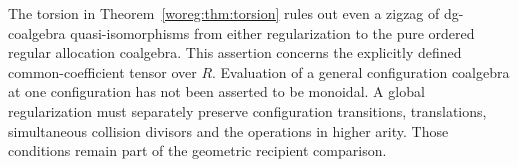 The torsion in Theorem~\ref{woreg:thm:torsion} rules out even a zigzag
of dg-coalgebra quasi-isomorphisms from either regularization to the
pure ordered regular allocation coalgebra.  This assertion concerns
the explicitly defined common-coefficient tensor over \(R\).
Evaluation of a general configuration coalgebra at one configuration
has not been asserted to be monoidal.  A global regularization must
separately preserve configuration transitions, translations, simultaneous
collision divisors and the operations in higher arity.  Those conditions
remain part of the geometric recipient comparison.
